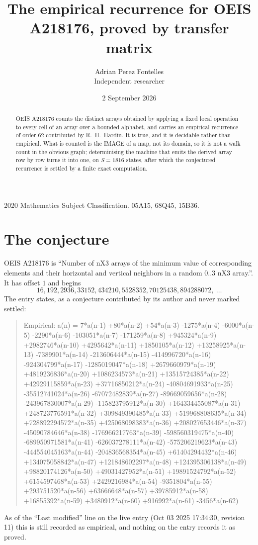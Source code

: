 \documentclass[11pt,a4paper]{article}
\title{The empirical recurrence for OEIS A218176, proved by transfer matrix}
\author{Adrian Perez Fontelles\\ \small Independent researcher}
\date{2 September 2026}
\theoremstyle{plain}
\theoremstyle{definition}
\begin{document}
\maketitle

\begin{abstract}
OEIS A218176 counts the distinct arrays obtained by applying a fixed local operation to every cell
of an array over a bounded alphabet, and carries an empirical recurrence of order $62$
contributed by R.~H.~Hardin. It is true, and it is decidable rather than empirical. What is
counted is the IMAGE of a map, not its domain, so it is not a walk count in the obvious graph;
determinising the machine that emits the derived array row by row turns it into one, on
$S=1816$ states, after which the conjectured recurrence is settled by a finite exact
computation.
\end{abstract}

\noindent\small 2020 Mathematics Subject Classification. 05A15, 68Q45, 15B36.\normalsize

\section{The conjecture}

OEIS A218176 is ``Number of nX3 arrays of the minimum value of corresponding elements and their horizontal and vertical neighbors in a random 0..3 nX3 array.''. It has offset $1$ and begins
\[
16, 192, 2936, 33152, 434210, 5528352, 70125438, 894288072,\ \dots
\]
The entry states, as a conjecture contributed by its author and never marked settled:
\begin{quote}
Empirical: a(n) = 7*a(n-1) +80*a(n-2) +54*a(n-3) -1275*a(n-4) -6000*a(n-5) -2290*a(n-6) -103051*a(n-7) -171259*a(n-8) +945324*a(n-9) +2982746*a(n-10) +4295642*a(n-11) +1850105*a(n-12) +13258925*a(n-13) -7389901*a(n-14) -213606444*a(n-15) -414996720*a(n-16) -924304799*a(n-17) -1285019047*a(n-18) +2679660979*a(n-19) +4819236836*a(n-20) +1086234573*a(n-21) +13515724385*a(n-22) +42929115859*a(n-23) +37716850212*a(n-24) -40804691933*a(n-25) -35512741024*a(n-26) -67072482839*a(n-27) -89669059656*a(n-28) -243967830007*a(n-29) -115823795912*a(n-30) +164334455087*a(n-31) +248723776591*a(n-32) +309849390485*a(n-33) +519968808635*a(n-34) +728892294572*a(n-35) +425068098383*a(n-36) +208027653446*a(n-37) -45090784646*a(n-38) -176966217763*a(n-39) -598560319475*a(n-40) -689950971581*a(n-41) -626037278111*a(n-42) -575206219623*a(n-43) -444554045163*a(n-44) -204836568354*a(n-45) +61404294432*a(n-46) +134075058842*a(n-47) +121848602297*a(n-48) +124395306138*a(n-49) +98820174126*a(n-50) +49031427952*a(n-51) +19891524792*a(n-52) +6154597468*a(n-53) +2429216984*a(n-54) -9351804*a(n-55) +293751520*a(n-56) +63666648*a(n-57) +39785912*a(n-58) +16855392*a(n-59) +3480912*a(n-60) +916992*a(n-61) -3456*a(n-62)
\end{quote}
As of the ``Last modified'' line on the live entry (Oct 03 2025 17:34:30, revision 11) this is still
recorded as empirical, and nothing on the entry records it as proved.
\end{document}
